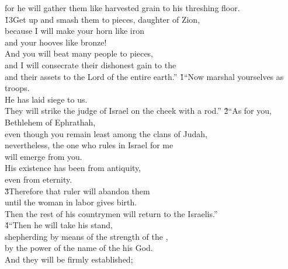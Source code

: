 \begin{poetry}
\poemlll       for he will gather them like harvested grain to his threshing floor. \\
\poeml \v{13}Get up and smash them to pieces, daughter of Zion, \\
\poemll    because I will make your horn like iron \\
\poemlll       and your hooves like bronze! \\
\poeml And you will beat many people to pieces, \\
\poemll    and I will consecrate their dishonest gain to the  \\
\poemlll       and their assets to the Lord of the entire earth.''
\poeml {}
\v{1}``Now marshal yourselves as troops. \\
\poeml He has laid siege to us. \\
\poemll    They will strike the judge of Israel on the cheek with a rod.''
\poeml \v{2}``As for you, Bethlehem of Ephrathah, \\
\poemll    even though you remain least among the clans of Judah, \\
\poeml nevertheless, the one who rules in Israel for me \\
\poemll    will emerge from you. \\
\poeml His existence has been from antiquity, \\
\poemll    even from eternity. \\
\poeml \v{3}Therefore that ruler will abandon them \\
\poemll    until the woman in labor gives birth. \\
\poeml Then the rest of his countrymen will return to the Israelis.'' \\
\poeml \v{4}``Then he will take his stand, \\
\poemll    shepherding by means of the strength of the , \\
\poemlll       by the power of the name of the  his God. \\
\poeml And they will be firmly established; \\

\end{poetry}
